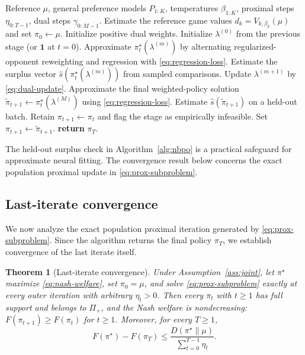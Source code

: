\documentclass{article}
\newtheorem{theorem}{Theorem}
\theoremstyle{remark}
\theoremstyle{plain}
\begin{document}
\begin{algorithm}[t]
\caption{Nash Bargaining Preference Optimization}
\label{alg:nbpo}
\begin{algorithmic}[1]
\REQUIRE Reference $\mu$, general preference models $P_{1:K}$, temperatures $\beta_{1:K}$, proximal steps $\eta_{0:T-1}$, dual steps $\gamma_{0:M-1}$.
\STATE Estimate the reference game values $d_k=V_{k,\beta_k}(\mu)$ and set $\pi_0\leftarrow\mu$.
\STATE Initialize positive dual weights.
    \STATE Initialize $\lambda^{(0)}$ from the previous stage (or $\mathbf 1$ at $t=0$).
        \STATE Approximate $\pi_t^\star(\lambda^{(m)})$ by alternating regularized-opponent reweighting and regression with \eqref{eq:regression-loss}.
        \STATE Estimate the surplus vector $\widehat s(\pi_t^\star(\lambda^{(m)}))$ from sampled comparisons.
        \STATE Update $\lambda^{(m+1)}$ by \eqref{eq:dual-update}.
    \ENDFOR
    \STATE Approximate the final weighted-policy solution $\widetilde\pi_{t+1}\leftarrow\pi_t^\star(\lambda^{(M)})$ using \eqref{eq:regression-loss}.
    \STATE Estimate $\widehat s(\widetilde\pi_{t+1})$ on a held-out batch.
        \STATE Retain $\pi_{t+1}\leftarrow\pi_t$ and flag the stage as empirically infeasible.
    \ELSE
        \STATE Set $\pi_{t+1}\leftarrow\widetilde\pi_{t+1}$.
    \ENDIF
\ENDFOR
\STATE \textbf{return} $\pi_T$.
\end{algorithmic}
\end{algorithm}

The held-out surplus check in Algorithm~\ref{alg:nbpo} is a practical safeguard for approximate neural fitting. The convergence result below concerns the exact population proximal update in \eqref{eq:prox-subproblem}.

\subsection{Last-iterate convergence}
We now analyze the exact population proximal iteration generated by \eqref{eq:prox-subproblem}. Since the algorithm returns the final policy $\pi_T$, we establish convergence of the last iterate itself.

\begin{theorem}[Last-iterate convergence]
\label{thm:last-iterate}
Under Assumption~\ref{ass:joint}, let $\pi^\star$ maximize
\eqref{eq:nash-welfare}, set $\pi_0=\mu$, and solve
\eqref{eq:prox-subproblem} exactly at every outer iteration with arbitrary
$\eta_t>0$. Then every $\pi_t$ with $t\ge1$ has full support and belongs to
$\Pi_+$, and the Nash welfare is nondecreasing:
$F(\pi_{t+1})\ge F(\pi_t)$ for $t\ge1$. Moreover, for every $T\ge1$,
\begin{equation}
F(\pi^\star)-F(\pi_T)
\le
\frac{D(\pi^\star\|\mu)}
{\sum_{t=0}^{T-1}\eta_t}.
\label{eq:last-iterate-rate}
\end{equation}
\end{theorem}
\end{document}
